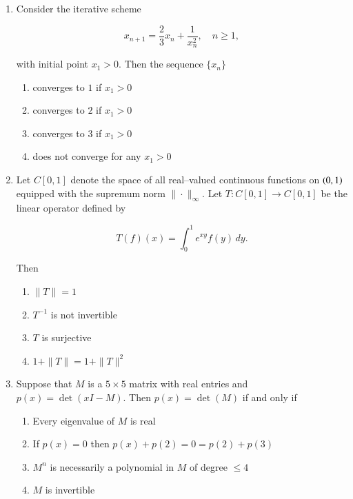 \documentclass[journal,12pt,onecolumn]{IEEEtran}
\theoremstyle{remark}
\begin{document}
\begin{enumerate}[start=1, label=Q.\arabic*]
\hfill{}

\item Consider the iterative scheme  

\[
x_{n+1} = \dfrac{2}{3}x_n + \dfrac{1}{x_n^2}, \quad n \geq 1,
\]

with initial point $x_1 > 0$. Then the sequence $\{x_n\}$  

\begin{enumerate}
\item converges to $1$ if $x_1 > 0$  
\item converges to $2$ if $x_1 > 0$  
\item converges to $3$ if $x_1 > 0$  
\item does not converge for any $x_1 > 0$  
\end{enumerate}

\hfill{}

\item Let $C[0,1]$ denote the space of all real–valued continuous functions on $\left(0,1\right)$ equipped with the supremum norm $\|\cdot\|_\infty$. Let $T : C[0,1] \to C[0,1]$ be the linear operator defined by  

\[
T(f)(x) = \int_0^1 e^{xy} f(y) \, dy.
\]

Then  

\begin{enumerate}
\item $\|T\| = 1$  
\item $T^{-1}$ is not invertible  
\item $T$ is surjective  
\item $1 + \|T\| = 1 + \|T\|^2$  
\end{enumerate}

\hfill{}

\item Suppose that $M$ is a $5 \times 5$ matrix with real entries and $p(x) = \det(xI-M)$. Then $p(x) = \det(M)$ if and only if  

\begin{enumerate}
\item Every eigenvalue of $M$ is real  
\item If $p(x) = 0$ then $p(x) + p(2) = 0 = p(2) + p(3)$  
\item $M^n$ is necessarily a polynomial in $M$ of degree $\leq 4$  
\item $M$ is invertible  
\end{enumerate}


\end{enumerate}
\end{document}
